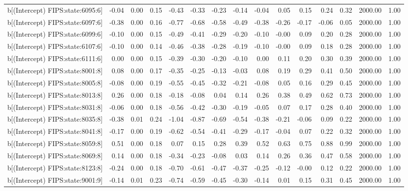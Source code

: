 \begin{table}[ht]
\begin{tabular}{rrrrrrrrrrrrrrr}
  b[(Intercept) FIPS:state:6095:6] & -0.04 & 0.00 & 0.15 & -0.43 & -0.33 & -0.23 & -0.14 & -0.04 & 0.05 & 0.15 & 0.24 & 0.32 & 2000.00 & 1.00 \\ 
  b[(Intercept) FIPS:state:6097:6] & -0.38 & 0.00 & 0.16 & -0.77 & -0.68 & -0.58 & -0.49 & -0.38 & -0.26 & -0.17 & -0.06 & 0.05 & 2000.00 & 1.00 \\ 
  b[(Intercept) FIPS:state:6099:6] & -0.10 & 0.00 & 0.15 & -0.49 & -0.41 & -0.29 & -0.20 & -0.10 & -0.00 & 0.09 & 0.20 & 0.28 & 2000.00 & 1.00 \\ 
  b[(Intercept) FIPS:state:6107:6] & -0.10 & 0.00 & 0.14 & -0.46 & -0.38 & -0.28 & -0.19 & -0.10 & -0.00 & 0.09 & 0.18 & 0.28 & 2000.00 & 1.00 \\ 
  b[(Intercept) FIPS:state:6111:6] & 0.00 & 0.00 & 0.15 & -0.39 & -0.30 & -0.20 & -0.10 & 0.00 & 0.11 & 0.20 & 0.30 & 0.39 & 2000.00 & 1.00 \\ 
  b[(Intercept) FIPS:state:8001:8] & 0.08 & 0.00 & 0.17 & -0.35 & -0.25 & -0.13 & -0.03 & 0.08 & 0.19 & 0.29 & 0.41 & 0.50 & 2000.00 & 1.00 \\ 
  b[(Intercept) FIPS:state:8005:8] & -0.08 & 0.00 & 0.19 & -0.55 & -0.45 & -0.32 & -0.21 & -0.08 & 0.05 & 0.16 & 0.29 & 0.45 & 2000.00 & 1.00 \\ 
  b[(Intercept) FIPS:state:8013:8] & 0.26 & 0.00 & 0.18 & -0.18 & -0.08 & 0.04 & 0.14 & 0.26 & 0.38 & 0.49 & 0.62 & 0.73 & 2000.00 & 1.00 \\ 
  b[(Intercept) FIPS:state:8031:8] & -0.06 & 0.00 & 0.18 & -0.56 & -0.42 & -0.30 & -0.19 & -0.05 & 0.07 & 0.17 & 0.28 & 0.40 & 2000.00 & 1.00 \\ 
  b[(Intercept) FIPS:state:8035:8] & -0.38 & 0.01 & 0.24 & -1.04 & -0.87 & -0.69 & -0.54 & -0.38 & -0.21 & -0.06 & 0.09 & 0.22 & 2000.00 & 1.00 \\ 
  b[(Intercept) FIPS:state:8041:8] & -0.17 & 0.00 & 0.19 & -0.62 & -0.54 & -0.41 & -0.29 & -0.17 & -0.04 & 0.07 & 0.22 & 0.32 & 2000.00 & 1.00 \\ 
  b[(Intercept) FIPS:state:8059:8] & 0.51 & 0.00 & 0.18 & 0.07 & 0.15 & 0.28 & 0.39 & 0.52 & 0.63 & 0.75 & 0.88 & 0.99 & 2000.00 & 1.00 \\ 
  b[(Intercept) FIPS:state:8069:8] & 0.14 & 0.00 & 0.18 & -0.34 & -0.23 & -0.08 & 0.03 & 0.14 & 0.26 & 0.36 & 0.47 & 0.58 & 2000.00 & 1.00 \\ 
  b[(Intercept) FIPS:state:8123:8] & -0.24 & 0.00 & 0.18 & -0.70 & -0.61 & -0.47 & -0.37 & -0.25 & -0.12 & -0.00 & 0.12 & 0.22 & 2000.00 & 1.00 \\ 
  b[(Intercept) FIPS:state:9001:9] & -0.14 & 0.01 & 0.23 & -0.74 & -0.59 & -0.45 & -0.30 & -0.14 & 0.01 & 0.15 & 0.31 & 0.45 & 2000.00 & 1.00 \\ 

\end{tabular}
\end{table}
